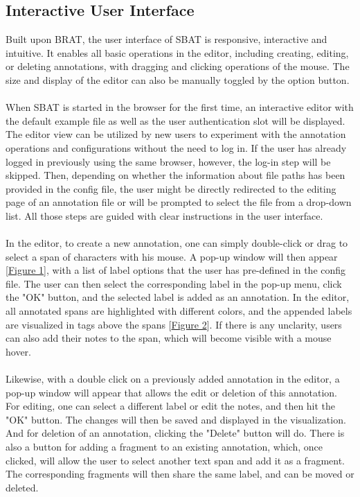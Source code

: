 \documentclass[12ptm a4paper]{article}
\begin{document}
\subsection{Interactive User Interface}
Built upon BRAT, the user interface of SBAT is responsive, interactive and intuitive. It enables all basic operations in the editor, including creating, editing, or deleting annotations, with dragging and clicking operations of the mouse. The size and display of the editor can also be manually toggled by the option button.\\
\\
When SBAT is started in the browser for the first time, an interactive editor with the default example file as well as the user authentication slot will be displayed. The editor view can be utilized by new users to experiment with the annotation operations and configurations without the need to log in. If the user has already logged in previously using the same browser, however, the log-in step will be skipped. Then, depending on whether the information about file paths has been provided in the config file, the user might be directly redirected to the editing page of an annotation file or will be prompted to select the file from a drop-down list. All those steps are guided with clear instructions in the user interface.\\
\\
In the editor, to create a new annotation, one can simply double-click or drag to select a span of characters with his mouse. A pop-up window will then appear [\hyperref[figure1]{Figure 1}], with a list of label options that the user has pre-defined in the config file. The user can then select the corresponding label in the pop-up menu, click the "OK" button, and the selected label is added as an annotation. In the editor, all annotated spans are highlighted with different colors, and the appended labels are visualized in tags above the spans [\hyperref[figure2]{Figure 2}]. If there is any unclarity, users can also add their notes to the span, which will become visible with a mouse hover.\\
\\
Likewise, with a double click on a previously added annotation in the editor, a pop-up window will appear that allows the edit or deletion of this annotation. For editing, one can select a different label or edit the notes, and then hit the "OK" button. The changes will then be saved and displayed in the visualization. And for deletion of an annotation, clicking the "Delete" button will do. There is also a button for adding a fragment to an existing annotation, which, once clicked, will allow the user to select another text span and add it as a fragment. The corresponding fragments will then share the same label, and can be moved or deleted.\\
\end{document}
